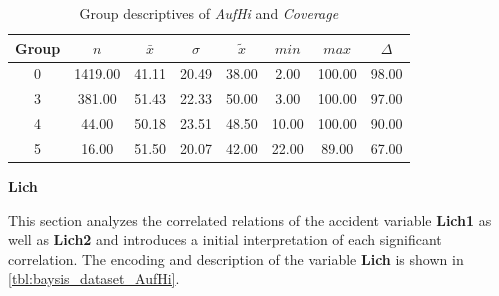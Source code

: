\begin{table}[ht]
	\tiny
	\centering
    \begin{tabular}{c|c|c|c|c|c|c|c}
        \toprule
        Group & $n$ & $\bar{x}$ & $\sigma$ & $\tilde{x}$ & $min$ & $max$ & $\Delta$ \\ 
        \midrule
        0 & 1419.00 & 41.11 & 20.49 & 38.00 & 2.00 & 100.00 & 98.00 \\ 
        3 & 381.00 & 51.43 & 22.33 & 50.00 & 3.00 & 100.00 & 97.00 \\ 
        4 & 44.00 & 50.18 & 23.51 & 48.50 & 10.00 & 100.00 & 90.00 \\ 
        5 & 16.00 & 51.50 & 20.07 & 42.00 & 22.00 & 89.00 & 67.00 \\ 
        \bottomrule
      \end{tabular}
	\caption{Group descriptives of \textit{AufHi} and \textit{Coverage}}
	\label{tbl:descriptives_baysis_matched_AufHi_Cov}
\end{table}

\Large
\centerline{\textbf{Lich}}
\normalsize
This section analyzes the correlated relations of the accident variable \textbf{Lich1} as well as \textbf{Lich2} and introduces a initial interpretation of each significant correlation. The encoding and description of the variable \textbf{Lich} is shown in \cref{tbl:baysis_dataset_AufHi}.

